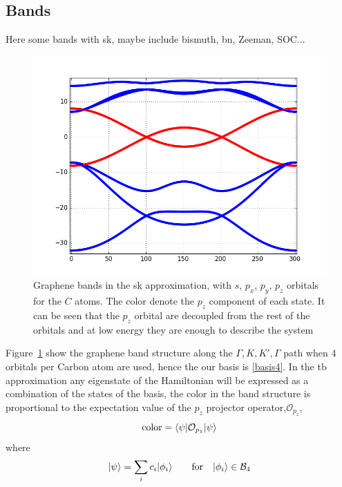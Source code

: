 \subsection{Bands}
Here some bands with \ac{sk}, maybe include bismuth, \ac{bn}, Zeeman, SOC...
\begin{figure}[h!]
\centering
\includegraphics{chapter04/figures/graphene_bands.png}
\vspace{-5pt}
\caption{Graphene bands in the \ac{sk} approximation, with $s$, $p_x$, $p_y$, $p_z$ orbitals for the $C$ atoms. The color denote the $p_z$ component of each state. It can be seen that the $p_z$ orbital are decoupled from the rest of the orbitals and at low energy they are enough to describe the system}
\label{Gbands}
\end{figure}
\FloatBarrier
Figure~\ref{Gbands} show the graphene band structure along the $\Gamma,K,K',\Gamma$ path when 4 orbitals per Carbon atom are used, hence the our basis is \eqref{basis4}. In the \ac{tb} approximation any eigenstate of the Hamiltonian will be expressed as a combination of the states of the basis, the color in the band structure is proportional to the expectation value of the $p_z$ projector operator,$\mathcal{O}_{p_z}$,
\begin{equation*}
  \text{color} = \langle\psi|\mathcal{O}_{p_z}|\psi\rangle
\end{equation*}
where
 \begin{equation*}
   |\psi\rangle = \sum_i c_i|\phi_i\rangle \qquad
   \text{for} \quad|\phi_i\rangle\in\mathcal{B}_4
 \end{equation*}



